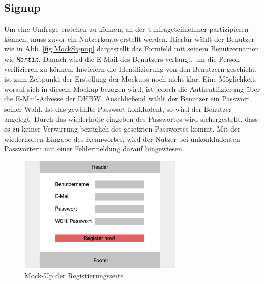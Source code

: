 \subsection{Signup}
\label{ssec:konzept:client:signup}
Um eine Umfrage erstellen zu können, an der Umfrageteilnehmer partizipieren können, muss zuvor ein Nutzerkonto erstellt werden. 
Hierfür wählt der Benutzer wie in Abb. \ref{fig:MockSignup} dargestellt das Formfeld mit seinem Benutzernamen wie \zb \emph{\texttt{Martin}}. 
Danach wird die E-Mail des Benutzers verlangt, um die Person verifizieren zu können. 
Inwiefern die Identifizierung von den Benutzern geschieht, ist zum Zeitpunkt der Erstellung der Mockups noch nicht klar. 
Eine Möglichkeit, worauf sich in diesem Mockup bezogen wird, ist jedoch die Authentifizierung über die E-Mail-Adresse der DHBW. 
Anschließend wählt der Benutzer ein Passwort seiner Wahl. 
Ist das gewählte Passwort konkludent, so wird der Benutzer angelegt.
Durch das wiederholte eingeben des Passwortes wird sichergestellt, dass es zu keiner Verwirrung bezüglich des gesetzten Passwortes kommt. 
Mit der wiederholten Eingabe des Kennwortes, wird der Nutzer bei unkonkludenten Passwörtern mit einer Fehlermeldung darauf hingewiesen.

\begin{figure}[H]
	\centering
	\includegraphics[width=0.7\textwidth]{img/konzeption/client/register}
	\captionsetup{justification=centering, format=plain}
	\caption[Mock-Up der Startseite]{Mock-Up der Registierungsseite \\\figma}
	\label{fig:MockRegister}
\end{figure}